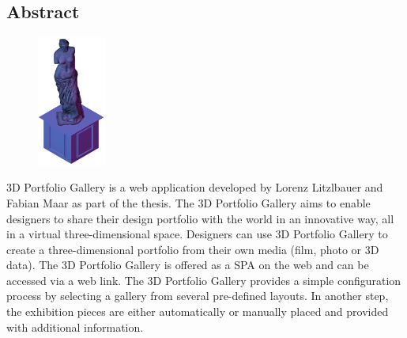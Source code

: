 \begin{spacing}{1}
    \chapter*{Abstract}
\end{spacing}
\begin{figure}
    \begin{center}
      \includegraphics[width=0.2\textwidth]{pics/statue.png}
    \end{center}
\end{figure}
3D Portfolio Gallery is a web application developed by Lorenz Litzlbauer and Fabian Maar as part of the thesis. The 3D Portfolio Gallery aims to enable designers to share their design portfolio with the world in an innovative way, all in a virtual three-dimensional space. Designers can use 3D Portfolio Gallery to create a three-dimensional portfolio from their own media (film, photo or 3D data).
The 3D Portfolio Gallery is offered as a SPA on the web and can be accessed via a web link.
The 3D Portfolio Gallery provides a simple configuration process by selecting a gallery from several pre-defined layouts. In another step, the exhibition pieces are either automatically or manually placed and provided with additional information.

